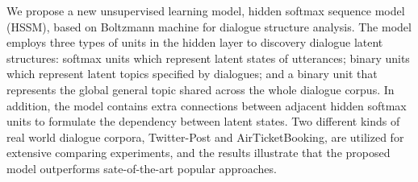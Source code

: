 We propose a new unsupervised learning model, hidden softmax sequence model (HSSM), based on Boltzmann machine for dialogue structure analysis. The model employs three types of units in the hidden layer to discovery  dialogue latent structures: softmax units which represent latent states of utterances; binary units which represent latent topics specified by dialogues; and a binary unit that represents the global general topic shared across the whole dialogue corpus. In addition, the model contains extra connections between adjacent hidden softmax units to formulate the dependency between latent states. Two different kinds of real world dialogue corpora, Twitter-Post  and AirTicketBooking, are utilized for extensive comparing experiments, and the results illustrate that the proposed model outperforms sate-of-the-art popular approaches.
